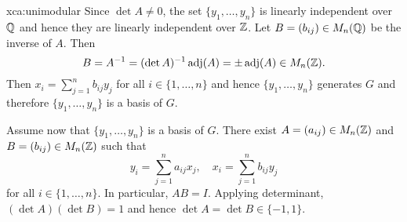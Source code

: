 \begin{sol}{xca:unimodular}
    Since $\det A\ne 0$, the set $\{y_1,\dots,y_n\}$ is linearly independent over $\mathbb{Q}$
    and hence they are linearly independent over $\mathbb{Z}$. 
    Let $B=(b_{ij})\in M_n(\mathbb{Q})$ be the inverse of $A$. Then 
    \[
    B=A^{-1}=(\det A)^{-1}\operatorname{adj}(A)=\pm\operatorname{adj}(A)\in M_n(\mathbb{Z}).
    \]
    Then $x_i=\sum_{j=1}^n b_{ij}y_j$ for all $i\in\{1,\dots,n\}$ 
    and hence $\{y_1,\dots,y_n\}$ generates $G$ and therefore 
    $\{y_1,\dots,y_n\}$ is a basis of $G$. 
    
    Assume now that $\{y_1,\dots,y_n\}$ is a basis of $G$. There exist
    $A=(a_{ij})\in M_n(\mathbb{Z})$ and $B=(b_{ij})\in M_n(\mathbb{Z})$ such that
    \[
    y_i=\sum_{j=1}^{n}a_{ij}x_j,\quad
    x_i=\sum_{j=1}^{n}b_{ij}y_j
    \]
    for all $i\in\{1,\dots,n\}$. In particular, 
    $AB=I$. Applying determinant, $(\det A)(\det B)=1$ and hence $\det A=\det B\in\{-1,1\}$. 
\end{sol}

    
